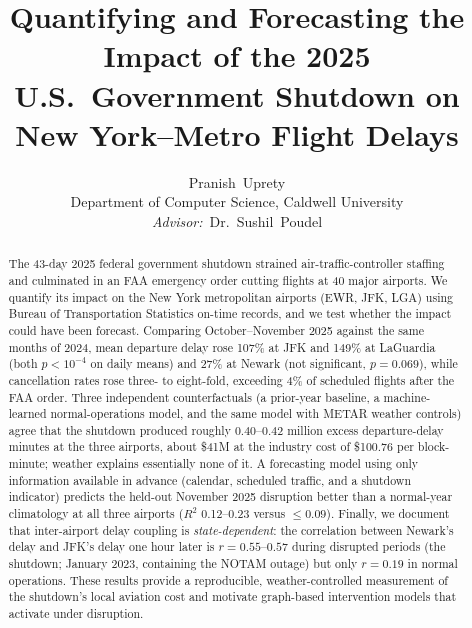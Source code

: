 \documentclass[10pt,journal]{IEEEtran}
\begin{document}
\title{Quantifying and Forecasting the Impact of the 2025 U.S.\ Government
Shutdown on New York--Metro Flight Delays}

\author{Pranish~Uprety\\
Department of Computer Science, Caldwell University\\
\textit{Advisor:}~Dr.~Sushil~Poudel}

\maketitle

\begin{abstract}
The 43-day 2025 federal government shutdown strained air-traffic-controller
staffing and culminated in an FAA emergency order cutting flights at 40 major
airports. We quantify its impact on the New York metropolitan airports (EWR,
JFK, LGA) using Bureau of Transportation Statistics on-time records, and we
test whether the impact could have been forecast. Comparing October--November
2025 against the same months of 2024, mean departure delay rose 107\% at JFK
and 149\% at LaGuardia (both $p<10^{-4}$ on daily means) and 27\% at Newark
(not significant, $p=0.069$), while cancellation rates rose three- to
eight-fold, exceeding 4\% of scheduled flights after the FAA order. Three
independent counterfactuals (a prior-year baseline, a machine-learned
normal-operations model, and the same model with METAR weather controls) agree
that the shutdown produced roughly $0.40$--$0.42$ million excess departure-delay
minutes at the three airports, about \$41M at the industry cost of
\$100.76 per block-minute; weather explains essentially none of it. A
forecasting model using only information available in advance (calendar,
scheduled traffic, and a shutdown indicator) predicts the held-out November
2025 disruption better than a normal-year climatology at all three airports
($R^2$ 0.12--0.23 versus $\le 0.09$). Finally, we document that inter-airport
delay coupling is \emph{state-dependent}: the correlation between Newark's
delay and JFK's delay one hour later is $r\!=\!0.55$--$0.57$ during disrupted
periods (the shutdown; January 2023, containing the NOTAM outage) but only
$r\!=\!0.19$ in normal operations. These results provide a reproducible,
weather-controlled measurement of the shutdown's local aviation cost and
motivate graph-based intervention models that activate under disruption.
\end{abstract}

\end{document}
